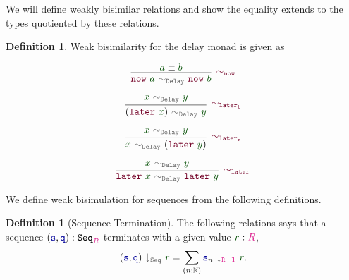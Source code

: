 \documentclass[twoside,11pt,openright]{report}
\theoremstyle{plain} %
\theoremstyle{definition}
\newtheorem{defn}[thm]{Definition}%
\theoremstyle{remark}
\newcommand*{\term}[1]{\textcolor{green!30!black}{#1}} %
\newcommand*{\type}[1]{\textcolor{magenta!90!black}{#1}}
\newcommand*{\unit}{\type{\textbf{1}}}
\newcommand*{\relation}[1]{\textcolor{gray!75!black}{\ensuremath{\mathtt{#1}}}}
\newcommand*{\function}[1]{\textcolor{blue!60!black}{\ensuremath{\mathtt{#1}}}}
\newcommand*{\constructor}[1]{\textcolor{purple!60!black}{\ensuremath{\mathtt{#1}}}}
\newcommand*{\typeformer}[1]{\ensuremath{\mathtt{#1}}}
\begin{document}
\noindent We will define weakly bisimilar relations and show the equality extends to the types quotiented by these relations.
\begin{defn}
  \label{defn:weak-bisim-delay-monad}
  Weak bisimilarity for the delay monad is given as
  \begin{center}
    \strut
    \hfill
    \begin{minipage}[h]{0.375\linewidth}
      \begin{equation}
        \vcenter{\infer[\constructor{\sim_{now}}]{\constructor{now}~\term{a}~\relation{\sim_{Delay}}~\constructor{now}~\term{b}}{\term{a} \equiv \term{b}}}
      \end{equation}
    \end{minipage}
    \hfill
    \begin{minipage}[h]{0.375\linewidth}
      \begin{equation}
        \vcenter{\infer[\constructor{\sim_{later_l}}]{(\constructor{later}~\term{x})~\relation{\sim_{Delay}}~\term{y}}{\term{x}~\relation{\sim_{Delay}}~\term{y}}}
      \end{equation}
    \end{minipage}
    \hfill
    \strut
  \end{center}
  \begin{center}
    \strut
    \hfill
    \begin{minipage}[h]{0.375\linewidth}
      \begin{equation}
        \vcenter{\infer[\constructor{\sim_{later_r}}]{\term{x}~\relation{\sim_{Delay}}~(\constructor{later}~\term{y})}{\term{x}~\relation{\sim_{Delay}}~\term{y}}}
      \end{equation}
    \end{minipage}
    \hfill
    \begin{minipage}[h]{0.425\linewidth}
      \begin{equation}
        \vcenter{\infer[\constructor{\sim_{later}}]{\constructor{later}~\term{x}~\relation{\sim_{Delay}}~\constructor{later}~\term{y}}{\term{x}~\relation{\sim_{Delay}}~\term{y}}}
      \end{equation}
    \end{minipage}
    \hfill
    \strut
  \end{center}
\end{defn}
\noindent We define weak bisimulation for sequences from the following definitions.
\begin{defn}[Sequence Termination]
  The following relations says that a sequence \((\function{s},\function{q}) : \typeformer{Seq}_{\type{R}}\) terminates with a given value \(\term{r} : \type{R}\),
  \begin{equation}
    (\function{s},\function{q})~\relation{\downarrow_{Seq}}~\term{r} = \sum_{(n : \mathbb{N})} \function{s}_n~\relation{\downarrow_{\type{R} + \unit}}~\term{r}.
  \end{equation}
\end{defn}
\end{document}
